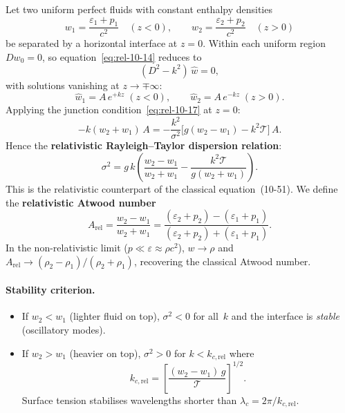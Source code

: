 Let two uniform perfect fluids with constant enthalpy densities
\begin{equation}
\label{eq:rel-10-18}
w_{1} = \frac{\varepsilon_{1}+p_{1}}{c^{2}}
\quad (z<0),
\qquad
w_{2} = \frac{\varepsilon_{2}+p_{2}}{c^{2}}
\quad (z>0)
\end{equation}
be separated by a horizontal interface at $z=0$.  Within each uniform
region $Dw_{0}=0$, so equation~\eqref{eq:rel-10-14} reduces to
\begin{equation}
\label{eq:rel-10-19}
(D^{2}-k^{2})\,\hat{w} = 0,
\end{equation}
with solutions vanishing at $z\to\mp\infty$:
\begin{equation}
\label{eq:rel-10-20}
\hat{w}_{1} = A\,e^{+kz}\;(z<0),
\qquad
\hat{w}_{2} = A\,e^{-kz}\;(z>0).
\end{equation}
Applying the junction condition~\eqref{eq:rel-10-17} at $z=0$:
\begin{equation}
\label{eq:rel-10-21}
-k(w_{2}+w_{1})\,A
= -\frac{k^{2}}{\sigma^{2}}\bigl[g(w_{2}-w_{1})-k^{2}\mathcal{T}\bigr]\,A.
\end{equation}
Hence the \textbf{relativistic Rayleigh--Taylor dispersion relation}:
\begin{equation}
\boxed{
\sigma^{2}
= g\,k\!\left(
  \frac{w_{2}-w_{1}}{w_{2}+w_{1}}
  - \frac{k^{2}\mathcal{T}}{g(w_{2}+w_{1})}
\right)\!.
}
\label{eq:rel-10-22}
\end{equation}
This is the relativistic counterpart of the classical
equation~(10-51).  We define the \textbf{relativistic Atwood number}
\begin{equation}
\label{eq:rel-10-23}
A_{\mathrm{rel}}
= \frac{w_{2}-w_{1}}{w_{2}+w_{1}}
= \frac{(\varepsilon_{2}+p_{2})-(\varepsilon_{1}+p_{1})}
       {(\varepsilon_{2}+p_{2})+(\varepsilon_{1}+p_{1})}.
\end{equation}
In the non-relativistic limit ($p \ll \varepsilon \approx \rho c^{2}$),
$w \to \rho$ and $A_{\mathrm{rel}} \to
(\rho_{2}-\rho_{1})/(\rho_{2}+\rho_{1})$, recovering the classical
Atwood number.

\paragraph{Stability criterion.}
\begin{itemize}
\item If $w_{2} < w_{1}$ (lighter fluid on top), $\sigma^{2}<0$
  for all~$k$ and the interface is \emph{stable} (oscillatory modes).
\item If $w_{2} > w_{1}$ (heavier on top), $\sigma^{2}>0$ for
  $k < k_{c,\mathrm{rel}}$ where
\begin{equation}
\label{eq:rel-10-24}
k_{c,\mathrm{rel}}
= \left[\frac{(w_{2}-w_{1})\,g}{\mathcal{T}}\right]^{1/2}\!.
\end{equation}
Surface tension stabilises wavelengths shorter than
$\lambda_{c}=2\pi/k_{c,\mathrm{rel}}$.
\end{itemize}

